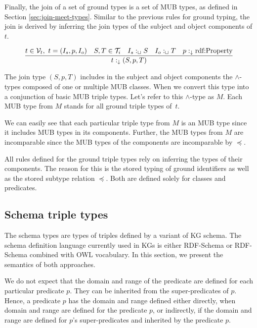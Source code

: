 \documentclass[runningheads]{llncs}
\newcommand{\darr}{\downarrow}
\newcommand{\V}{{\cal V}}
\newcommand{\T}{{\cal T}}
\begin{document}
Finally, the join of a set of ground types is a set of MUB types, as
defined in Section \ref{sec:join-meet-types}. Similar to the
previous rules for ground typing, the join is derived by inferring the
join types of the subject and object components of $t$.

\begin{equation}
\label{rul:3-join}
\dfrac{t\in\V_t,\ t=(I_s,p,I_o)\quad S,T\in\T_i\quad I_s:_\sqcup\/S\quad I_o:_\sqcup\/T\quad p:_\darr\text{rdf:Property}}
      {t:_\darr\/(S,p,T)}
\end{equation}

The join type $(S,p,T)$ includes in the subject and object components
the $\land$-types composed of one or multiple MUB classes. When we
convert this type into a conjunction of basic MUB triple types. Let's
refer to this $\land$-type as $M$. Each MUB type from $M$ stands for
all ground triple types of~$t$.

We can easily see that each particular triple type from $M$ is an MUB
type since it includes MUB types in its components. Further, the MUB
types from $M$ are incomparable since the MUB types of the components
are incomparable by $\preceq$.

All rules defined for the ground triple types rely on inferring the
types of their components. The reason for this is the stored typing
of ground identifiers as well as the stored subtype relation $\preceq$.
Both are defined solely for classes and predicates.





\subsection{Schema triple types\label{sec:stored-3types}}

The schema types are types of triples defined by a variant of KG
schema. The schema definition language currently used in KGs is either
RDF-Schema \cite{rdfschema} or RDF-Schema combined with OWL
\cite{owl2} vocabulary. In this section, we present the semantics of
both approaches.

We do not expect that the domain and range of the predicate are defined
for each particular predicate $p$. They can be inherited from the
super-predicates of $p$. Hence, a predicate $p$ has the domain and
range defined either directly, when domain and range are defined for
the predicate $p$, or indirectly, if the domain and range are defined
for $p$'s super-predicates and inherited by the predicate $p$.
\end{document}
